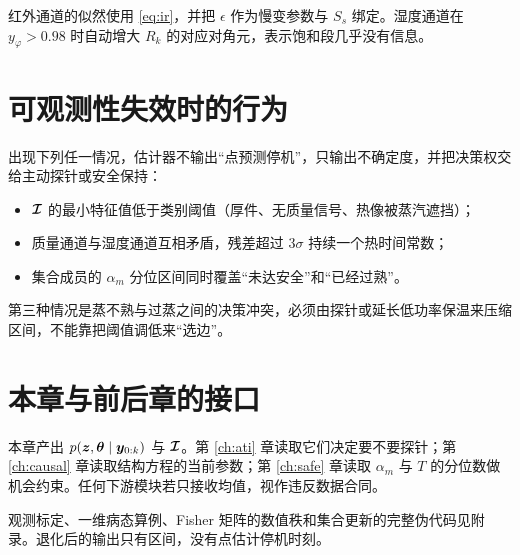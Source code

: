 红外通道的似然使用 \eqref{eq:ir}，并把 $\epsilon$ 作为慢变参数与 $S_s$ 绑定。湿度通道在 $y_\varphi>0.98$ 时自动增大 $R_k$ 的对应对角元，表示饱和段几乎没有信息。

\section{可观测性失效时的行为}

出现下列任一情况，估计器不输出“点预测停机”，只输出不确定度，并把决策权交给主动探针或安全保持：

\begin{itemize}
\item $\bm{\mathcal{I}}$ 的最小特征值低于类别阈值（厚件、无质量信号、热像被蒸汽遮挡）；
\item 质量通道与湿度通道互相矛盾，残差超过 $3\sigma$ 持续一个热时间常数；
\item 集合成员的 $\alpha_m$ 分位区间同时覆盖“未达安全”和“已经过熟”。
\end{itemize}

第三种情况是蒸不熟与过蒸之间的决策冲突，必须由探针或延长低功率保温来压缩区间，不能靠把阈值调低来“选边”。

\section{本章与前后章的接口}

本章产出 $p(\bm{z},\bm{\theta}\mid\bm{y}_{0:k})$ 与 $\bm{\mathcal{I}}$。第 \ref{ch:ati} 章读取它们决定要不要探针；第 \ref{ch:causal} 章读取结构方程的当前参数；第 \ref{ch:safe} 章读取 $\alpha_m$ 与 $T$ 的分位数做机会约束。任何下游模块若只接收均值，视作违反数据合同。

观测标定、一维病态算例、Fisher 矩阵的数值秩和集合更新的完整伪代码见附录。退化后的输出只有区间，没有点估计停机时刻。
